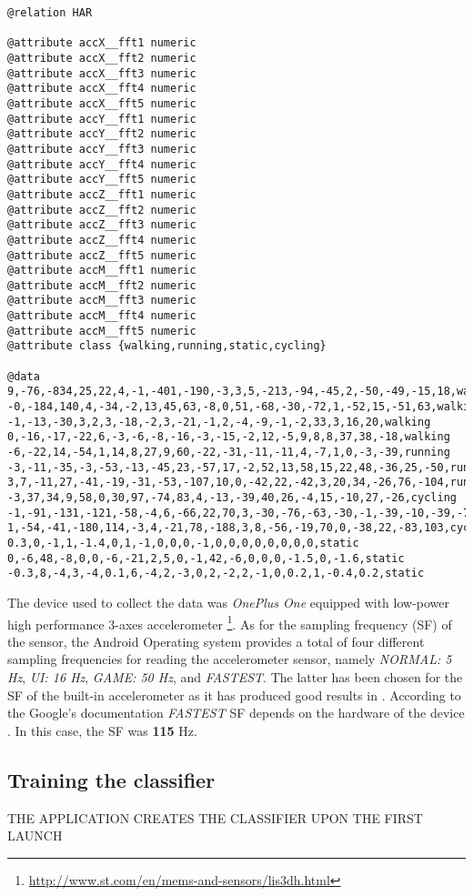 \begin{lstlisting}[caption=WEKA ARFF file extract,
label=weka-arff-code,captionpos=b, frame=single,basicstyle=\small,float,floatplacement=H,breaklines=true]
@relation HAR
    
@attribute accX__fft1 numeric
@attribute accX__fft2 numeric
@attribute accX__fft3 numeric
@attribute accX__fft4 numeric
@attribute accX__fft5 numeric
@attribute accY__fft1 numeric
@attribute accY__fft2 numeric
@attribute accY__fft3 numeric
@attribute accY__fft4 numeric
@attribute accY__fft5 numeric
@attribute accZ__fft1 numeric
@attribute accZ__fft2 numeric
@attribute accZ__fft3 numeric
@attribute accZ__fft4 numeric
@attribute accZ__fft5 numeric
@attribute accM__fft1 numeric
@attribute accM__fft2 numeric
@attribute accM__fft3 numeric
@attribute accM__fft4 numeric
@attribute accM__fft5 numeric
@attribute class {walking,running,static,cycling}
    
@data
9,-76,-834,25,22,4,-1,-401,-190,-3,3,5,-213,-94,-45,2,-50,-49,-15,18,walking
-0,-184,140,4,-34,-2,13,45,63,-8,0,51,-68,-30,-72,1,-52,15,-51,63,walking
-1,-13,-30,3,2,3,-18,-2,3,-21,-1,2,-4,-9,-1,-2,33,3,16,20,walking
0,-16,-17,-22,6,-3,-6,-8,-16,-3,-15,-2,12,-5,9,8,8,37,38,-18,walking
-6,-22,14,-54,1,14,8,27,9,60,-22,-31,-11,-11,4,-7,1,0,-3,-39,running
-3,-11,-35,-3,-53,-13,-45,23,-57,17,-2,52,13,58,15,22,48,-36,25,-50,running
3,7,-11,27,-41,-19,-31,-53,-107,10,0,-42,22,-42,3,20,34,-26,76,-104,running
-3,37,34,9,58,0,30,97,-74,83,4,-13,-39,40,26,-4,15,-10,27,-26,cycling
-1,-91,-131,-121,-58,-4,6,-66,22,70,3,-30,-76,-63,-30,-1,-39,-10,-39,-76,cycling
1,-54,-41,-180,114,-3,4,-21,78,-188,3,8,-56,-19,70,0,-38,22,-83,103,cycling
0.3,0,-1,1,-1.4,0,1,-1,0,0,0,-1,0,0,0,0,0,0,0,0,static
0,-6,48,-8,0,0,-6,-21,2,5,0,-1,42,-6,0,0,0,-1.5,0,-1.6,static
-0.3,8,-4,3,-4,0.1,6,-4,2,-3,0,2,-2,2,-1,0,0.2,1,-0.4,0.2,static
\end{lstlisting}
    
    The device used to collect the data was \textit{OnePlus One} equipped with low-power high performance 3-axes accelerometer \footnote{\url{http://www.st.com/en/mems-and-sensors/lis3dh.html}}. As for the sampling frequency (SF) of the sensor, the Android Operating system provides a total of four different sampling frequencies for reading the accelerometer sensor, namely \textit{NORMAL: 5 Hz}, \textit{UI: 16 Hz}, \textit{GAME: 50 Hz}, and \textit{FASTEST}. The latter has been chosen for the SF of the built-in accelerometer as it has produced good results in \citet[3-5]{lee2016}. According to the Google's documentation \textit{FASTEST} SF depends on the hardware of the device \citep{googlesensormanager2017}. In this case, the SF was \textbf{115} Hz. 
    
    \subsection{Training the classifier}
    THE APPLICATION CREATES THE CLASSIFIER UPON THE FIRST LAUNCH
    
    
    